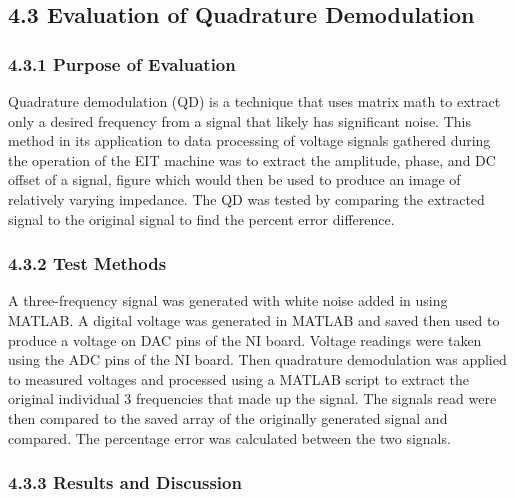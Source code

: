 \subsection*{4.3 Evaluation of Quadrature
Demodulation}\label{evaluation-of-quadrature-demodulation}

\subsubsection*{\texorpdfstring{\textbf{4.3.1 Purpose of
Evaluation}}{4.3.1 Purpose of Evaluation}}\label{purpose-of-evaluation-1}

Quadrature demodulation (QD) is a technique that uses matrix math to
extract only a desired frequency from a signal that likely has
significant noise. This method in its application to data processing of
voltage signals gathered during the operation of the EIT machine was to
extract the amplitude, phase, and DC offset of a signal, figure which
would then be used to produce an image of relatively varying impedance.
The QD was tested by comparing the extracted signal to the original
signal to find the percent error difference.

\subsubsection*{\texorpdfstring{\textbf{4.3.2 Test
Methods}}{4.3.2 Test Methods}}\label{test-methods-1}

A three-frequency signal was generated with white noise added in using
MATLAB. A digital voltage was generated in MATLAB and saved then used to
produce a voltage on DAC pins of the NI board. Voltage readings were
taken using the ADC pins of the NI board. Then quadrature demodulation
was applied to measured voltages and processed using a MATLAB script to
extract the original individual 3 frequencies that made up the signal.
The signals read were then compared to the saved array of the originally
generated signal and compared. The percentage error was calculated
between the two signals.

\subsubsection*{\texorpdfstring{\textbf{4.3.3 Results and
Discussion~}}{4.3.3 Results and Discussion~}}\label{results-and-discussion-1}

